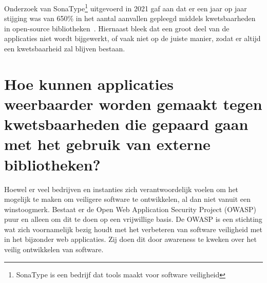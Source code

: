 Onderzoek van SonaType\footnote{SonaType is een bedrijf dat tools maakt voor software veiligheid} uitgevoerd in 2021 gaf aan dat er een jaar op jaar stijging was van 650\% in het aantal aanvallen gepleegd middels kwetsbaarheden in open-source bibliotheken~\citep{Sonatype:2021}.
Hiernaast bleek dat een groot deel van de applicaties niet wordt bijgewerkt, of vaak niet op de juiste manier, zodat er altijd een kwetsbaarheid zal blijven bestaan.

\section{Hoe kunnen applicaties weerbaarder worden gemaakt tegen kwetsbaarheden die gepaard gaan met het gebruik van externe bibliotheken?}\label{sec:hoe-kan-er-voorkomen-worden-dat-er-kwetsbaarheden-ontstaan-in-een-applicatie-die-gebruik-maakt-van-externe-bibliotheken?}

Hoewel er veel bedrijven en instanties zich verantwoordelijk voelen om het mogelijk te maken om veiligere software te ontwikkelen, al dan niet vanuit een winstoogmerk. Bestaat er de Open Web Application Security Project (OWASP) puur en alleen om dit te doen op een vrijwillige basis. De OWASP is een stichting wat zich voornamelijk bezig houdt met het verbeteren van software veiligheid met in het bijzonder web applicaties. Zij doen dit door awareness te kweken over het veilig ontwikkelen van software.

